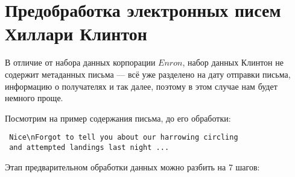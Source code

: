 
\section{Предобработка электронных писем Хиллари Клинтон}

В отличие от набора данных корпорации $Enron$, набор данных Клинтон
 не содержит метаданных письма --- всё уже разделено на дату отправки письма, 
 информацию о получателях и так далее, поэтому в этом случае нам будет немного
 проще.

Посмотрим на пример содержания письма, до его обработки:
\begin{verbatim}
 Nice\nForgot to tell you about our harrowing circling 
 and attempted landings last night ...
\end{verbatim}


Этап предварительном обработки данных можно разбить на 7 шагов:

